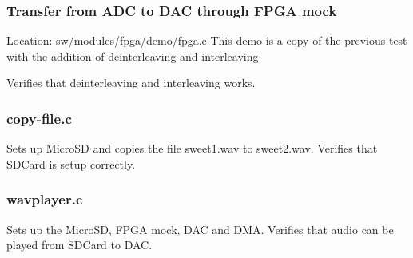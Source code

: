 \subsubsection{Transfer from ADC to DAC through FPGA mock}
Location: sw/modules/fpga/demo/fpga.c
This demo is a copy of the previous test with the addition of deinterleaving and interleaving


Verifies that deinterleaving and interleaving works.

\subsubsection{copy-file.c}
Sets up MicroSD and copies the file sweet1.wav to sweet2.wav.
Verifies that SDCard is setup correctly.

\subsubsection{wavplayer.c}
Sets up the MicroSD, FPGA mock, DAC and DMA.
Verifies that audio can be played from SDCard to DAC.
